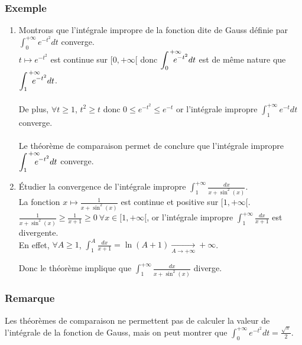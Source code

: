 \documentclass[a4paper,10pt]{book} %
\newcommand{\displayAmath}{\displaystyle}
\begin{document}
\subsubsection{Exemple}
\begin{enumerate}
\item Montrons que l'intégrale impropre de la fonction dite de Gauss définie par $\displayAmath \int_0^{+\infty}e^{-t^2}dt$ converge.\\
$t\mapsto e^{-t^2}$ est continue sur $[0,+\infty[$ donc $\displayAmath \int_0^{\mathclap{~~~~~+\infty}}~e^{-t^2}dt$ est de même nature que $\displayAmath \int_1^{\mathclap{~~~~~+\infty}}~e^{-t^2}dt$.\\\\
De plus, $\forall t\geq 1$, $t^2\geq t$ donc $0\leq e^{-t^2}\leq e^{-t}$ or l'intégrale impropre $\displayAmath \int_1^{+\infty}e^{-t}dt$ converge.\\\\
Le théorème de comparaison permet de conclure que l'intégrale impropre $\displayAmath \int_{1}^{\mathclap{~~~~~+\infty}}~~e^{-t^2}dt$ converge.

\item
Étudier la convergence de l'intégrale impropre $\displayAmath \int_1^{+\infty}\frac{dx}{x+\sin^2(x)}$.\\

La fonction $x\mapsto \frac{1}{x+\sin^2(x)}$ est continue et positive sur $[1,+\infty[$.\\
$\displayAmath\frac{1}{x+\sin^2(x)}\geq \frac{1}{x+1}\geq 0 ~\forall x\in [1,+\infty[$, or l'intégrale impropre $\displayAmath \int_1^{+\infty}\frac{dx}{x+1}$ est divergente.\\

En effet, $\forall A\geq 1$, $\displayAmath \int_1^A\frac{dx}{x+1}=\ln(A+1)\underset{A\rightarrow +\infty}{\rightarrow} +\infty$.

Donc le théorème implique que $\displayAmath \int_1^{+\infty}\frac{dx}{x+\sin^2(x)}$ diverge.
\end{enumerate}

\subsubsection{Remarque}
Les théorèmes de comparaison ne permettent pas de calculer la valeur de l'intégrale de la fonction de Gauss, mais on peut montrer que $\displayAmath \int_0^{+\infty}e^{-t^2}dt=\frac{\sqrt{\pi}}{2}$.

\newpage
\end{document}
